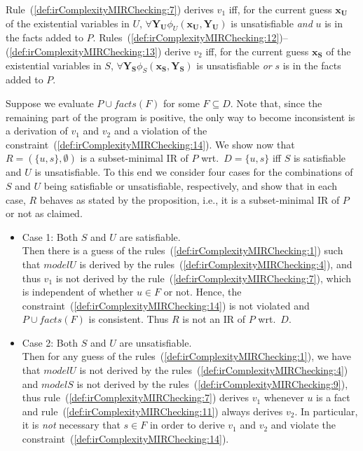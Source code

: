 \documentclass[11pt,fleqn,twoside]{article}
\renewcommand{\vec}[1]{\ensuremath{\mb{#1}}}
\newcommand{\mb}[1]{\ensuremath{\mathbf{#1}}}
\newcommand{\toFacts}[1]{\mathit{facts}(#1)}
\begin{document}
{					Rule~(\ref{def:irComplexityMIRChecking:7}) derives $v_1$ iff, for the current guess $\vec{x_U}$ of the existential variables in $U$,
					$\forall \vec{Y_U} \phi_U(\vec{x_U}, \vec{Y_U})$ is unsatisfiable \emph{and} $u$ is in the facts added to $P$.
					Rules~(\ref{def:irComplexityMIRChecking:12})--(\ref{def:irComplexityMIRChecking:13}) derive $v_2$ iff, for the current guess $\vec{x_S}$ of the existential variables in $S$,
					$\forall \vec{Y_S} \phi_S(\vec{x_S}, \vec{Y_S})$ is unsatisfiable \emph{or} $s$ is in the facts added to $P$.

					Suppose we evaluate $P \cup \toFacts{F}$ for some $F \subseteq D$. Note that, since the remaining part of the program is positive, the
					only way to become inconsistent is a derivation of $v_1$ and $v_2$ and a violation of the constraint~(\ref{def:irComplexityMIRChecking:14}).
					We show now that $R = (\{u, s\}, \emptyset)$ is a subset-minimal IR of $P$ wrt.~$D = \{ u, s \}$ iff $S$ is satisfiable and $U$ is unsatisfiable.
					To this end we consider four cases for the combinations of $S$ and $U$ being satisfiable or unsatisfiable, respectively,
					and show that in each case, $R$ behaves as stated by the proposition, i.e., it is a subset-minimal IR of $P$ or not as claimed.
					\begin{itemize}
						\item Case 1: Both $S$ and $U$ are satisfiable. \\
							Then there is a guess of the rules~(\ref{def:irComplexityMIRChecking:1}) such that $\mathit{modelU}$ is derived by the rules~(\ref{def:irComplexityMIRChecking:4}), and thus $v_1$ is not derived
							by the rule~(\ref{def:irComplexityMIRChecking:7}),
							which is independent of whether $u \in F$ or not.
							Hence, the constraint~(\ref{def:irComplexityMIRChecking:14}) is not violated and $P \cup \toFacts{F}$ is consistent.
							Thus $R$ is not an IR of $P$ wrt.~$D$.
						\item Case 2: Both $S$ and $U$ are unsatisfiable. \\
							Then for any guess of the rules~(\ref{def:irComplexityMIRChecking:1}), we have that $\mathit{modelU}$ is not derived by the rules~(\ref{def:irComplexityMIRChecking:4})
							and $\mathit{modelS}$ is not derived by the rules~(\ref{def:irComplexityMIRChecking:9}),
							thus
							rule~(\ref{def:irComplexityMIRChecking:7}) derives $\mathit{v_1}$ whenever $u$ is a fact and
							rule~(\ref{def:irComplexityMIRChecking:11})
							always derives $\mathit{v_2}$. In particular, it is \emph{not} necessary that $s \in F$ in order to derive $v_1$ and $v_2$ and violate the constraint~(\ref{def:irComplexityMIRChecking:14}).

\end{itemize}}
\end{document}
